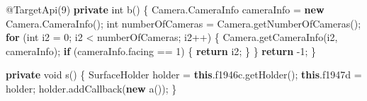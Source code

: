 \documentclass[
]{article}
\newenvironment{Shaded}{}{}
\newcommand{\AttributeTok}[1]{\textcolor[rgb]{0.49,0.56,0.16}{#1}}
\newcommand{\ControlFlowTok}[1]{\textcolor[rgb]{0.00,0.44,0.13}{\textbf{#1}}}
\newcommand{\DataTypeTok}[1]{\textcolor[rgb]{0.56,0.13,0.00}{#1}}
\newcommand{\DecValTok}[1]{\textcolor[rgb]{0.25,0.63,0.44}{#1}}
\newcommand{\FunctionTok}[1]{\textcolor[rgb]{0.02,0.16,0.49}{#1}}
\newcommand{\KeywordTok}[1]{\textcolor[rgb]{0.00,0.44,0.13}{\textbf{#1}}}
\newcommand{\NormalTok}[1]{#1}
\newcommand{\OperatorTok}[1]{\textcolor[rgb]{0.40,0.40,0.40}{#1}}
\begin{document}
\begin{Shaded}
\begin{Highlighting}[]
    \AttributeTok{@TargetApi}\OperatorTok{(}\DecValTok{9}\OperatorTok{)}
    \KeywordTok{private} \DataTypeTok{int} \FunctionTok{b}\OperatorTok{()} \OperatorTok{\{}
\NormalTok{        Camera}\OperatorTok{.}\FunctionTok{CameraInfo}\NormalTok{ cameraInfo }\OperatorTok{=} \KeywordTok{new}\NormalTok{ Camera}\OperatorTok{.}\FunctionTok{CameraInfo}\OperatorTok{();}
        \DataTypeTok{int}\NormalTok{ numberOfCameras }\OperatorTok{=}\NormalTok{ Camera}\OperatorTok{.}\FunctionTok{getNumberOfCameras}\OperatorTok{();}
        \ControlFlowTok{for} \OperatorTok{(}\DataTypeTok{int}\NormalTok{ i2 }\OperatorTok{=} \DecValTok{0}\OperatorTok{;}\NormalTok{ i2 }\OperatorTok{\textless{}}\NormalTok{ numberOfCameras}\OperatorTok{;}\NormalTok{ i2}\OperatorTok{++)} \OperatorTok{\{}
\NormalTok{            Camera}\OperatorTok{.}\FunctionTok{getCameraInfo}\OperatorTok{(}\NormalTok{i2}\OperatorTok{,}\NormalTok{ cameraInfo}\OperatorTok{);}
            \ControlFlowTok{if} \OperatorTok{(}\NormalTok{cameraInfo}\OperatorTok{.}\FunctionTok{facing} \OperatorTok{==} \DecValTok{1}\OperatorTok{)} \OperatorTok{\{}
                \ControlFlowTok{return}\NormalTok{ i2}\OperatorTok{;}
            \OperatorTok{\}}
        \OperatorTok{\}}
        \ControlFlowTok{return} \OperatorTok{{-}}\DecValTok{1}\OperatorTok{;}
    \OperatorTok{\}}

    \KeywordTok{private} \DataTypeTok{void} \FunctionTok{s}\OperatorTok{()} \OperatorTok{\{}
\NormalTok{        SurfaceHolder holder }\OperatorTok{=} \KeywordTok{this}\OperatorTok{.}\FunctionTok{f1946c}\OperatorTok{.}\FunctionTok{getHolder}\OperatorTok{();}
        \KeywordTok{this}\OperatorTok{.}\FunctionTok{f1947d} \OperatorTok{=}\NormalTok{ holder}\OperatorTok{;}
\NormalTok{        holder}\OperatorTok{.}\FunctionTok{addCallback}\OperatorTok{(}\KeywordTok{new} \FunctionTok{a}\OperatorTok{());}
    \OperatorTok{\}}


\end{Highlighting}
\end{Shaded}
\end{document}
